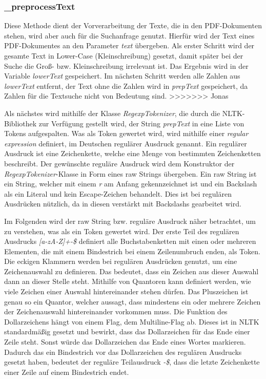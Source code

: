 \subsubsection{\_preprocessText}\label{preprocess}
Diese Methode dient der Vorverarbeitung der Texte, die in den PDF-Dokumenten stehen, wird aber auch für die Suchanfrage genutzt. Hierfür wird der Text eines PDF-Dokumentes an den Parameter \textit{text} übergeben. Als erster Schritt wird der gesamte Text in Lower-Case (Kleinschreibung) gesetzt, damit später bei der Suche die Groß- bzw. Kleinschreibung irrelevant ist. Das Ergebnis wird in der Variable \textit{lowerText} gespeichert. Im nächsten Schritt werden alle Zahlen aus \textit{lowerText} entfernt, der Text ohne die Zahlen wird in \textit{prepText} gespeichert, da Zahlen für die Textsuche nicht von Bedeutung sind.
>>>>>>> Jonas

Als nächstes wird mithilfe der Klasse \textit{RegexpTokenizer}, die durch die NLTK-Bibliothek zur Verfügung gestellt wird, der String \textit{prepText} in eine Liste von Tokens aufgespalten. Was als Token gewertet wird, wird mithilfe einer \textit{regular expression} definiert, im Deutschen regulärer Ausdruck genannt. Ein regulärer Ausdruck ist eine Zeichenkette, welche eine Menge von bestimmten Zeichenketten beschreibt. Der gewünschte reguläre Ausdruck wird dem Konstruktor der \textit{RegexpTokenizer}-Klasse in Form eines raw Strings übergeben. Ein raw String ist ein String, welcher mit einem \textit{r} am Anfang gekennzeichnet ist und ein Backslash als ein Literal und kein Escape-Zeichen behandelt. Dies ist bei regulären Ausdrücken nützlich, da in diesen verstärkt mit Backslashs gearbeitet wird.

Im Folgenden wird der raw String bzw. reguläre Ausdruck näher betrachtet, um zu verstehen, was als ein Token gewertet wird. Der erste Teil des regulären Ausdrucks \textit{[a-zA-Z]+-\$} definiert alle Buchstabenketten mit einen oder mehreren Elementen, die mit einem Bindestrich bei einem Zeilenumbruch enden, als Token. Die eckigen Klammern werden bei regulären Ausdrücken genutzt, um eine Zeichenauswahl zu definieren. Das bedeutet, dass ein Zeichen aus dieser Auswahl dann an dieser Stelle steht. Mithilfe von Quantoren kann definiert werden, wie viele Zeichen einer Auswahl hintereinander stehen dürfen. Das Pluszeichen ist genau so ein Quantor, welcher aussagt, dass mindestens ein oder mehrere Zeichen der Zeichenauswahl hintereinander vorkommen muss. Die Funktion des Dollarzeichens hängt von einem Flag, dem Multiline-Flag ab. Dieses ist in NLTK standardmäßig gesetzt und bewirkt, dass das Dollarzeichen für das Ende einer Zeile steht.\cite{nltk} Sonst würde das Dollarzeichen das Ende eines Wortes markieren. Dadurch das ein Bindestrich vor das Dollarzeichen des regulären Ausdrucks gesetzt haben, bedeutet der reguläre Teilausdruck \textit{-\$}, dass die letzte Zeichenkette einer Zeile auf einem Bindestrich endet.

